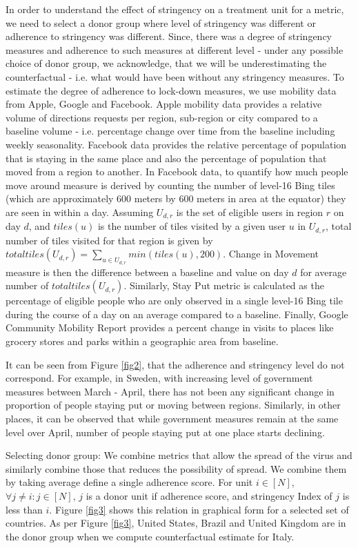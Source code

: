 \documentclass[preprint,authoryear,12pt]{elsarticle}
\begin{document}
    In order to understand the effect of stringency on a treatment unit for a metric, we need to select a donor group where level of stringency was different or adherence to stringency was different. Since, there was a degree of stringency measures and adherence to such measures at different level - under any possible choice of donor group, we acknowledge, that we will be underestimating the counterfactual - i.e. what would have been without any stringency measures. To estimate the degree of adherence to lock-down measures, we use mobility data from Apple, Google and Facebook. Apple mobility data provides a relative volume of directions requests per region, sub-region or city compared to a baseline volume - i.e. percentage change over time from the baseline including weekly seasonality. Facebook data provides the relative percentage of population that is staying in the same place and also the percentage of population that moved from a region to another.  In Facebook data, to quantify how much people move around measure is derived by counting the number of level-16 Bing tiles (which are approximately 600 meters by 600 meters in area at the equator) they are seen in within a day. Assuming $U_{d,r}$ is the set of eligible users in region $r$ on day $d$, and $tiles(u)$ is the number of tiles visited by a given user $u$ in $U_{d,r}$, total number of tiles visited for that region is given by $totaltiles(U_{d,r}) = \sum_{u \in U_{d,r}} min(tiles(u), 200)$. Change in Movement measure is then the difference between a baseline and value on day $d$ for average number of $totaltiles(U_{d,r})$. Similarly, Stay Put metric is calculated as the percentage of eligible people who are only observed in a single level-16 Bing tile during the course of a day on an average compared to a baseline. Finally, Google Community Mobility Report provides a percent change in visits to places like grocery stores and parks within a geographic area from baseline.
    
    It can be seen from Figure \ref{fig2}, that the adherence  and stringency level do not correspond. For example, in Sweden, with increasing level of government measures between March - April, there has not been any significant change in proportion of people staying put or moving between regions. Similarly, in other places, it can be observed that while government measures remain at the same level over April, number of people staying put at one place starts declining. 
    
    Selecting donor group: We combine metrics that allow the spread of the virus and similarly combine those that reduces the possibility of spread. We combine them by taking average define a single adherence score. For unit $i \in [N]$, $\forall j \neq i : j \in [N]$, $j$ is a donor unit if adherence score, and stringency Index of $j$ is less than $i$. Figure \ref{fig3} shows this relation in graphical form for a selected set of countries. As per Figure \ref{fig3}, United States, Brazil and United Kingdom are in the donor group when we compute counterfactual estimate for Italy. 
    
\end{document}
